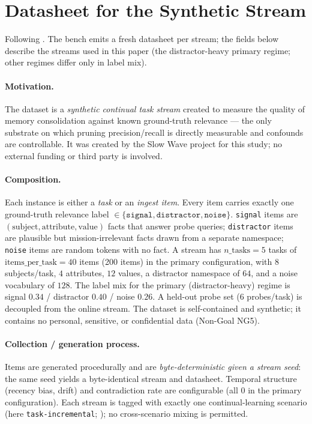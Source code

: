 \section{Datasheet for the Synthetic Stream}\label{app:datasheet}

Following \citet{gebru2021datasheets}. The bench emits a fresh datasheet per
stream; the fields below describe the streams used in this paper (the
distractor-heavy primary regime; other regimes differ only in label mix).

\paragraph{Motivation.} The dataset is a \emph{synthetic continual task stream}
created to measure the quality of memory consolidation against known
ground-truth relevance --- the only substrate on which pruning precision/recall
is directly measurable and confounds are controllable. It was created by the
Slow Wave project for this study; no external funding or third party is involved.

\paragraph{Composition.} Each instance is either a \emph{task} or an
\emph{ingest item}. Every item carries exactly one ground-truth relevance label
$\in\{\texttt{signal},\texttt{distractor},\texttt{noise}\}$. \texttt{signal}
items are $(\text{subject},\text{attribute},\text{value})$ facts that answer
probe queries; \texttt{distractor} items are plausible but mission-irrelevant
facts drawn from a separate namespace; \texttt{noise} items are random tokens
with no fact. A stream has $n\_\text{tasks}=5$ tasks of
$\text{items\_per\_task}=40$ items (200 items) in the primary configuration,
with $8$ subjects/task, $4$ attributes, $12$ values, a distractor namespace of
$64$, and a noise vocabulary of $128$. The label mix for the primary
(distractor-heavy) regime is signal $0.34$ / distractor $0.40$ / noise $0.26$.
A held-out probe set ($6$ probes/task) is decoupled from the online stream. The
dataset is self-contained and synthetic; it contains no personal, sensitive, or
confidential data (Non-Goal NG5).

\paragraph{Collection / generation process.} Items are generated procedurally
and are \emph{byte-deterministic given a stream seed}: the same seed yields a
byte-identical stream and datasheet. Temporal structure (recency bias, drift)
and contradiction rate are configurable (all $0$ in the primary configuration).
Each stream is tagged with exactly one continual-learning scenario
(here \texttt{task-incremental}; \citealp{vandeven2022threetypes}); no
cross-scenario mixing is permitted.

